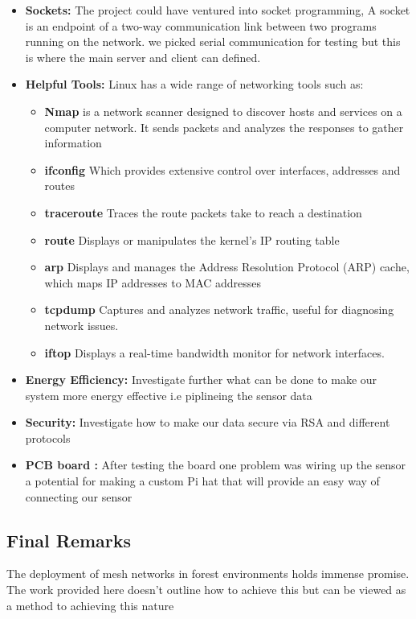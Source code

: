\begin{itemize}
    \item \textbf{Sockets:} The project could have ventured into socket programming, A socket is an endpoint of a two-way communication link between two programs running on the network. we picked serial communication for testing but this is where the main server and client can defined.
    \item \textbf{Helpful Tools:}  Linux has a wide range of networking tools such as:
    \begin{itemize}
        \item\textbf{Nmap} is a network scanner designed to discover hosts and services on a computer network. It sends packets and analyzes the responses to gather information 
        \item \textbf{ifconfig} Which provides extensive control over interfaces, addresses and routes
        \item \textbf{traceroute} Traces the route packets take to reach a destination
        \item \textbf{route} Displays or manipulates the kernel's IP routing table
        \item \textbf{arp} Displays and manages the Address Resolution Protocol (ARP) cache, which maps IP addresses to MAC addresses
        \item \textbf{tcpdump} Captures and analyzes network traffic, useful for diagnosing network issues.
        \item \textbf{iftop} Displays a real-time bandwidth monitor for network interfaces.
    \end{itemize} 
    \item \textbf{Energy Efficiency:} Investigate further what can be done to make  our system more energy effective i.e piplineing the sensor data
    \item \textbf{Security:} Investigate how to make our data secure via RSA and different protocols
    \item \textbf{PCB board :} After testing the board one problem was wiring up the sensor a potential for making a custom  Pi hat that will provide an easy way of connecting  our sensor 
 
   
\end{itemize}

\subsection{Final Remarks}
The deployment of mesh networks in forest environments holds immense promise. The work provided here doesn't outline how to achieve this but can be viewed as a method to achieving  this nature